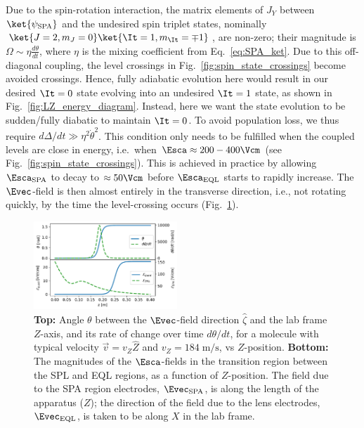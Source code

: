 Due to the spin-rotation interaction, the matrix elements of $J_Y$ between $\ket{\psi_{\rm SPA}}$ and the undesired spin triplet states, nominally $\ket{J=2, m_J = 0}\ket{\It=1,m_{\It}=\mp 1}$, are non-zero; their magnitude is $\Omega \sim \eta \frac{d\theta}{dt}$, where $\eta$ is the mixing coefficient from Eq.~\ref{eq:SPA_ket}. Due to this off-diagonal coupling, the level crossings in Fig.~\ref{fig:spin_state_crossings} become avoided crossings. Hence, fully adiabatic evolution here would result in our desired $\It=0$ state evolving into an undesired $\It=1$ state, as shown in Fig.~\ref{fig:LZ_energy_diagram}. Instead, here we want the state evolution to be sudden/fully diabatic to maintain $\It=0$. To avoid population loss, we thus require $ d\Delta/dt \gg \eta^2 \dot{\theta}^2 $. This condition only needs to be fulfilled when the coupled levels are close in energy, i.e.\ when $\Esca \approx 200-400 \Vcm$ (see Fig.~\ref{fig:spin_state_crossings}). This is achieved in practice by allowing $\Esca_{\rm SPA}$ to decay to $ \approx 50 \Vcm $ before $\Esca_{\rm EQL}$ starts to rapidly increase. The $\Evec$-field is then almost entirely in the transverse direction, i.e., not rotating quickly, by the time the level-crossing occurs (Fig.~\ref{fig:rotating_electric_field}).
\begin{figure}
	\centering
	\includegraphics[width=0.48\textwidth,unit=1mm]{figs/matplotlib/rotating_electric_field.pdf}
	\caption{\textbf{Top:} Angle $\theta$ between the $\Evec$-field direction $\hat{\zeta}$ and the lab frame $Z$-axis, and its rate of change over time $d\theta/dt$, for a molecule with typical velocity $\vec{v} = v_Z\hat{Z}$ and $v_Z = 184 \;\mathrm{m/s}$, vs $Z$-position. \textbf{Bottom:} The magnitudes of the $\Esca$-fields in the transition region between the SPL and EQL regions, as a function of $Z$-position. The field due to the SPA region electrodes, $\Evec_\text{SPA}$, is along the length of the apparatus ($Z$); the direction of the field due to the lens electrodes, $\Evec_\text{EQL}$, is taken to be along $X$ in the lab frame. }
	\label{fig:rotating_electric_field}
\end{figure}

